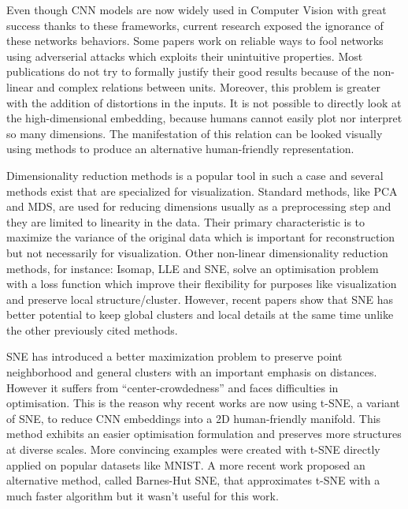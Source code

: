 \documentclass[a4paper,12pt]{report}
\begin{document}
Even though CNN models are now widely used in Computer Vision with great success thanks to these frameworks, current research exposed the ignorance of these networks behaviors.
Some papers work on reliable ways to fool networks using adverserial attacks which exploits their unintuitive properties\cite{szegedy2013intriguing}.
Most publications do not try to formally justify their good results because of the non-linear and complex relations between units. %
Moreover, this problem is greater with the addition of distortions in the inputs.
It is not possible to directly look at the high-dimensional embedding, because humans cannot easily plot nor interpret so many dimensions.
The manifestation of this relation can be looked visually using methods to produce an alternative human-friendly representation.

Dimensionality reduction methods is a popular tool in such a case\cite{dai2014document}\cite{taylor2011learning} and several methods exist that are specialized for visualization.
Standard methods, like PCA and MDS\cite{cox2000multidimensional}, are used for reducing dimensions usually as a preprocessing step and they are limited to linearity in the data.
Their primary characteristic is to maximize the variance of the original data which is important for reconstruction but not necessarily for visualization.
Other non-linear dimensionality reduction methods, for instance: Isomap\cite{tenenbaum2000global}, LLE\cite{roweis2000nonlinear} and SNE\cite{SNE}, solve an optimisation problem with a loss function which improve their flexibility for purposes like visualization and preserve local structure/cluster.
However, recent papers show that SNE has better potential to keep global clusters and local details at the same time unlike the other previously cited methods\cite{SNE}.

SNE has introduced a better maximization problem to preserve point neighborhood and general clusters with an important emphasis on distances\cite{SNE}.
However it suffers from ``center-crowdedness'' and faces difficulties in optimisation\cite{t-SNE}.
This is the reason why recent works are now using t-SNE, a variant of SNE, to reduce CNN embeddings into a 2D human-friendly manifold. %
This method exhibits an easier optimisation formulation and preserves more structures at diverse scales.
More convincing examples were created with t-SNE directly applied on popular datasets\cite{van2009new} like MNIST\cite{t-SNE}.
A more recent work proposed an alternative method, called Barnes-Hut SNE, that approximates t-SNE with a much faster algorithm but it wasn't useful for this work\cite{van2013barnes}.
\end{document}
